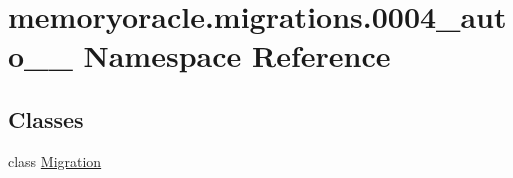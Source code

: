 \hypertarget{namespacememoryoracle_1_1migrations_1_10004__auto__20150402__2000}{}\section{memoryoracle.\+migrations.0004\+\_\+auto\+\_\+\_ Namespace Reference}
\label{namespacememoryoracle_1_1migrations_1_10004__auto__20150402__2000}
\subsection*{Classes}
\begin{DoxyCompactItemize}
\item 
class \hyperlink{classmemoryoracle_1_1migrations_1_10004__auto__20150402__2000_1_1Migration}{Migration}
\end{DoxyCompactItemize}

